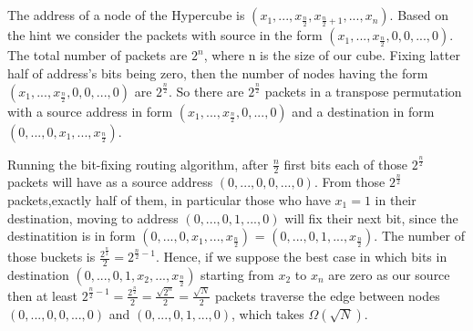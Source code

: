 \documentclass[11pt]{537homework}
\begin{document}
\subsection{}
The address of a node of the Hypercube is $(x_1,...,x_{\frac{n}{2}},x_{\frac{n}{2} +1},...,x_n)$. Based on the hint we consider the packets with source in the form $(x_1,...,x_{\frac{n}{2}},0,0,...,0)$. The total number of packets are $2^n$, where n is the size of our cube. Fixing latter half of address's bits being zero, then the number of nodes having the form $(x_1,...,x_{\frac{n}{2}},0,0,...,0)$ are $2^{\frac{n}{2}}$. So there are $2^{\frac{n}{2}}$ packets in a transpose permutation with a source address in form $(x_1,...,x_{\frac{n}{2}},0,...,0)$ and a destination in form $(0,...,0,x_1,...,x_{\frac{n}{2}})$. 
\par Running the bit-fixing routing algorithm, after $\frac{n}{2}$ first bits each of those $2^\frac{n}{2}$ packets will have as a source address $(0,...,0,0,...,0)$. From those $2^\frac{n}{2}$ packets,exactly half of them, in particular those who have $x_1 = 1$ in their destination, moving to address $(0,...,0,1,...,0)$ will fix their next bit, since the destinatition is in form $(0,...,0,x_1,...,x_{\frac{n}{2}})$ = $(0,...,0,1,...,x_{\frac{n}{2}})$. The number of those buckets is $\displaystyle{\frac{2^\frac{n}{2}}{2}} = 2^{\frac{n}{2} - 1}$. Hence, if we suppose the best case in which bits in destination $(0,...,0,1,x_2,...,x_{\frac{n}{2}})$ starting from $x_2$ to $x_n$ are zero as our source then at least $2^{\frac{n}{2} - 1} =\frac{2^\frac{n}{2}}{2} = \frac{\sqrt{2^n}}{2} = \frac{\sqrt{N}}{2}$ packets traverse the edge between nodes $(0,...,0,0,...,0)$ and $(0,...,0,1,...,0)$, which takes $\Omega(\sqrt{N})$.
\subsection{}
\end{document}
